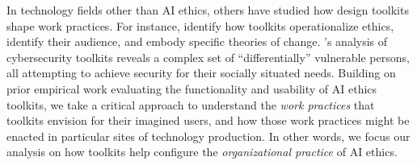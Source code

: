 \documentclass[acmsmall]{acmart}
\begin{document}
In technology fields other than AI ethics, others have studied how design toolkits shape work practices.
For instance, \citet{chivukula2021surveying} identify how toolkits operationalize ethics, identify their audience, and embody specific theories of change. 
\citet{pierce2018differential}'s analysis of cybersecurity toolkits reveals a complex set of ``differentially'' vulnerable persons, all attempting to achieve security for their socially situated needs. Building on prior empirical work evaluating the functionality and usability of AI ethics toolkits, we take a critical approach to understand the \textit{work practices} that toolkits envision for their imagined users, and how those work practices might be enacted in particular sites of technology production.
In other words, we focus our analysis on how toolkits help configure the \textit{organizational practice} of AI ethics. %


\end{document}
